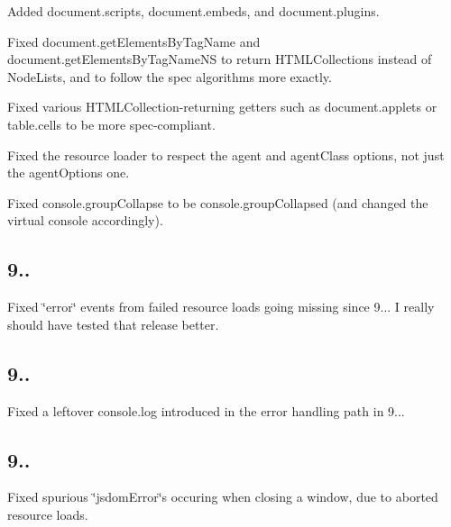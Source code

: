 \begin{DoxyItemize}
\item Added {\ttfamily document.\+scripts}, {\ttfamily document.\+embeds}, and {\ttfamily document.\+plugins}.
\item Fixed {\ttfamily document.\+get\+Elements\+By\+Tag\+Name} and {\ttfamily document.\+get\+Elements\+By\+Tag\+Name\+NS} to return {\ttfamily H\+T\+M\+L\+Collection}s instead of {\ttfamily Node\+List}s, and to follow the spec algorithms more exactly.
\item Fixed various {\ttfamily H\+T\+M\+L\+Collection}-\/returning getters such as {\ttfamily document.\+applets} or {\ttfamily table.\+cells} to be more spec-\/compliant.
\item Fixed the resource loader to respect the {\ttfamily agent} and {\ttfamily agent\+Class} options, not just the {\ttfamily agent\+Options} one.
\item Fixed {\ttfamily console.\+group\+Collapse} to be {\ttfamily console.\+group\+Collapsed} (and changed the virtual console accordingly).
\end{DoxyItemize}

\subsection*{9..}


\begin{DoxyItemize}
\item Fixed {\ttfamily \char`\"{}error\char`\"{}} events from failed resource loads going missing since 9... I really should have tested that release better.
\end{DoxyItemize}

\subsection*{9..}


\begin{DoxyItemize}
\item Fixed a leftover {\ttfamily console.\+log} introduced in the error handling path in 9...
\end{DoxyItemize}

\subsection*{9..}


\begin{DoxyItemize}
\item Fixed spurious {\ttfamily \char`\"{}jsdom\+Error\char`\"{}}s occuring when closing a window, due to aborted resource loads.
\end{DoxyItemize}

